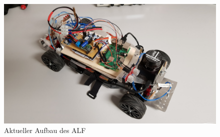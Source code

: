 


\begin{figure}[hbtp]
\centering
\includegraphics[scale=0.105]{images/chapter2/alf_new.jpg}
\caption{Aktueller Aufbau des ALF}
\label{fig:alf_new}
\end{figure}
